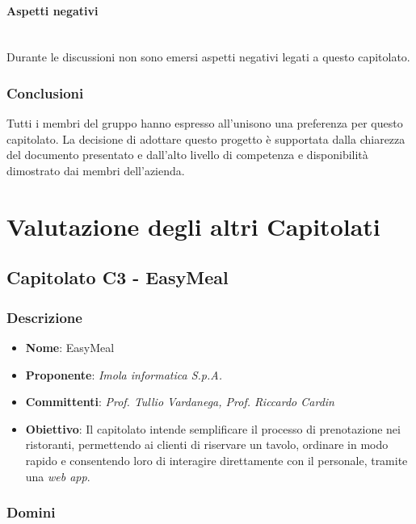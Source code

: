 \documentclass[italian,12pt]{article} %
\begin{document}
\paragraph{Aspetti negativi}\mbox{}\\
Durante le discussioni non sono emersi aspetti negativi legati a questo capitolato.

\subsubsection{Conclusioni}
Tutti i membri del gruppo hanno espresso all'unisono una preferenza per questo capitolato.
La decisione di adottare questo progetto è supportata dalla chiarezza del documento
presentato e dall'alto livello di competenza e disponibilità dimostrato dai membri dell'azienda.

\section{Valutazione degli altri Capitolati}

\subsection{Capitolato C3 - EasyMeal}

\subsubsection{Descrizione}
\begin{itemize}
	\item \textbf{Nome}: EasyMeal
	\item \textbf{Proponente}: {\it Imola informatica S.p.A.}
	\item \textbf{Committenti}: {\it Prof. Tullio Vardanega, Prof. Riccardo Cardin}
	\item \textbf{Obiettivo}: Il capitolato intende semplificare il processo di prenotazione nei ristoranti,
	      permettendo ai clienti di riservare un tavolo, ordinare in modo rapido e consentendo
	      loro di interagire direttamente con il personale, tramite una \textit{web app}.
\end{itemize}

\subsubsection{Domini}
\end{document}
